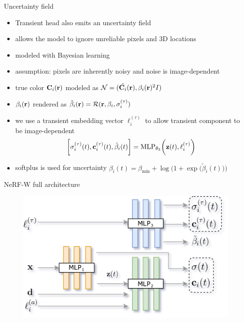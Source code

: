 \documentclass[aspectratio=1610]{beamer}
\newcommand{\parenth}[2][]{#1(#2#1)}
\begin{document}
\begin{frame}{Uncertainty field}
    \begin{itemize}
        \item Transient head also emits an uncertainty field
        \item allows the model to ignore unreliable pixels and 3D locations
        \item modeled with Bayesian learning
        \item assumption: pixels are inherently noisy  and noise is image-dependent
        \item true color \(\vb{C}_i (\vb{r})\) modeled as \(\mathcal{N} = (\hat{\vb{C}_i} (\vb{r}), \beta_i (\vb{r})^2 I)\)
        \item \(\beta_i (\vb{r})\) rendered  as \(\hat{\beta}_i (\vb{r}) = \mathcal{R}(\vb{r}, \beta_i, \sigma_i^{(\tau)})\)
        \item we use a transient embedding vector \(\ell_i^{(\tau)}\) to allow transient component to be image-dependent
        \begin{equation*}
            \bigg[\sigma_i^{(\tau)} (t), \vb{c}_i^{(\tau)} (t), \tilde{\beta}_i (t)\bigg] = \textrm{MLP}_{\theta_3} \parenth[\bigg]{\vb{z}(t), \ell_i^{(\tau)}}
        \end{equation*}
        \item softplus is used for uncertainty \(\beta_i (t) = \beta_{\textrm{min}} + \log \parenth[\bigg]{1+\exp \parenth[\bigg]{\tilde{\beta}_i (t)}}\)
    \end{itemize}
\end{frame}

\begin{frame}{NeRF-W full architecture}
    \begin{figure}[H]
        \centering
        \includegraphics[width=.8\textwidth,keepaspectratio]{nerfw-architecture.png}
    \end{figure}
\end{frame}
\end{document}
